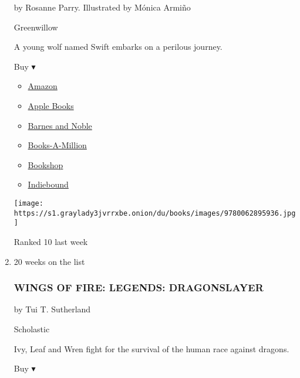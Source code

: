 \begin{enumerate}
  by Rosanne Parry. Illustrated by Mónica Armiño

  Greenwillow

  A young wolf named Swift embarks on a perilous journey.

  Buy ▾

  \begin{itemize}
  \tightlist
  \item
    \href{https://www.amazon.com/Wolf-Called-Wander-Rosanne-Parry/dp/0062895931?tag=NYTBS-20}{Amazon}
  \item
    \href{https://du-gae-books-dot-nyt-du-prd.appspot.com/buy?title=A+WOLF+CALLED+WANDER\&author=Rosanne+Parry}{Apple
    Books}
  \item
    \href{https://www.anrdoezrs.net/click-7990613-11819508?url=https\%3A\%2F\%2Fwww.barnesandnoble.com\%2Fw\%2F\%3Fean\%3D9780062895936}{Barnes
    and Noble}
  \item
    \href{https://www.anrdoezrs.net/click-7990613-35140?url=https\%3A\%2F\%2Fwww.booksamillion.com\%2Fp\%2FA\%2BWOLF\%2BCALLED\%2BWANDER\%2FRosanne\%2BParry\%2F9780062895936}{Books-A-Million}
  \item
    \href{https://bookshop.org/a/3546/9780062895936}{Bookshop}
  \item
    \href{https://www.indiebound.org/book/9780062895936?aff=NYT}{Indiebound}
  \end{itemize}

  \texttt{[image: https://s1.graylady3jvrrxbe.onion/du/books/images/9780062895936.jpg]}

  Ranked 10 last week
\item
  20 weeks on the list

  \hypertarget{wings-of-fire-legends-dragonslayer}{%
  \subsubsection{WINGS OF FIRE: LEGENDS:
  DRAGONSLAYER}\label{wings-of-fire-legends-dragonslayer}}

  by Tui T. Sutherland

  Scholastic

  Ivy, Leaf and Wren fight for the survival of the human race against
  dragons.

  Buy ▾


\end{enumerate}
